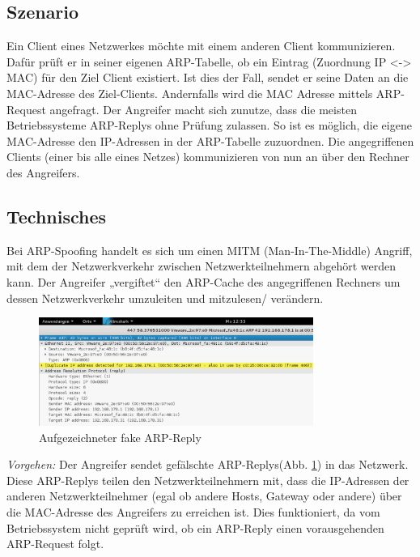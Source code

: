 \subsection*{Szenario}
Ein Client eines Netzwerkes möchte mit einem anderen Client kommunizieren. Dafür prüft er in seiner eigenen ARP-Tabelle, ob ein Eintrag (Zuordnung IP <-> MAC) für den Ziel Client existiert. Ist dies der Fall, sendet er seine Daten an die MAC-Adresse des Ziel-Clients. Andernfalls wird die MAC Adresse mittels ARP-Request angefragt.
Der Angreifer macht sich zunutze, dass die meisten Betriebssysteme ARP-Replys ohne Prüfung zulassen. So ist es möglich, die eigene MAC-Adresse den IP-Adressen in der ARP-Tabelle zuzuordnen. Die angegriffenen Clients (einer bis alle eines Netzes) kommunizieren von nun an über den Rechner des Angreifers.



\subsection*{Technisches}
Bei ARP-Spoofing handelt es sich um einen MITM (Man-In-The-Middle) Angriff, mit dem der Netzwerkverkehr zwischen Netzwerkteilnehmern abgehört werden kann.
Der Angreifer „vergiftet“ den ARP-Cache des angegriffenen Rechners um dessen Netzwerkverkehr umzuleiten und mitzulesen/ verändern.

\begin{figure}[h!]
	\centering
		\includegraphics[width=0.80\textwidth]{bilder/arpSpoofing/fake_arp_small.pdf}
	\caption{Aufgezeichneter fake ARP-Reply}
	\label{fig:fake_arp_small}
\end{figure}

\textit{Vorgehen:}
Der Angreifer sendet gefälschte ARP-Replys(Abb. \ref{fig:fake_arp_small}) in das Netzwerk. Diese ARP-Replys teilen den Netzwerkteilnehmern mit, dass die IP-Adressen der anderen Netzwerkteilnehmer (egal ob andere Hosts, Gateway oder andere) über die MAC-Adresse des Angreifers zu erreichen ist. Dies funktioniert, da vom Betriebssystem nicht geprüft wird, ob ein ARP-Reply einen vorausgehenden ARP-Request folgt.

